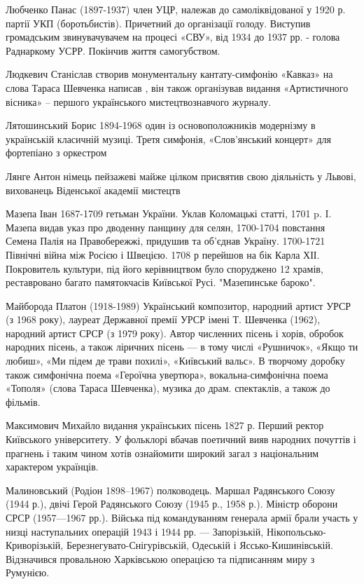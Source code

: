 Любченко Панас (1897-1937) член УЦР, належав до самоліквідованої у 1920 р. партії УКП (боротьбистів). Причетний до організації голоду. Виступив громадським звинувачувачем на процесі «СВУ», від 1934 до 1937 рр. - голова Раднаркому УСРР. Покінчив життя самогубством.

Людкевич Станіслав створив монументальну кантату-симфонію «Кавказ» на слова Тараса Шевченка написав , він також організував видання «Артистичного вісника» – першого українського мистецтвознавчого журналу. 

Лятошинський Борис 1894-1968 один із основоположників модернізму в українській класичній музиці.  Третя симфонія, «Слов’янський концерт» для фортепіано з оркестром

Лянге Антон  німець  пейзажеві майже цілком присвятив свою діяльність у Львові, вихованець Віденської академії мистецтв  

Мазепа  Іван 1687-1709 гетьман України. Уклав Коломацькі статті, 1701 p. I. Мазепа видав указ про дводенну панщину для селян, 1700-1704 повстання Семена Палія на Правобережжі, придушив та об’єднав Україну. 1700-1721 Північні війна між Росією і Швецією. 1708 р перейшов на бік Карла ХІІ. Покровитель культури, під його керівництвом було споруджено 12 храмів, реставровано багато памятокчасів Київської Русі. "Мазепинське бароко".

Майборода Платон (1918-1989) Український композитор, народний артист УРСР (з 1968 року), лауреат Державної премії УРСР імені Т. Шевченка (1962), народний артист СРСР (з 1979 року). Автор численних пісень і хорів, обробок народних пісень, а також ліричних пісень — в тому числі «Рушничок», «Якщо ти любиш», «Ми підем де трави похилі», «Київський вальс». В творчому доробку також симфонічна поема «Героїчна увертюра», вокальна-симфонічна поема «Тополя» (слова Тараса Шевченка), музика до драм. спектаклів, а також до фільмів.

Максимович Михайло видання українських пісень 1827 р. Перший ректор Київського університету. У фольклорі вбачав поетичний вияв народних почуттів і прагнень і таким чином хотів ознайомити широкий загал з національним характером українців.

Малиновський (Родіон 1898–1967) полководець. Маршал Радянського Союзу (1944 р.), двічі Герой Радянського Союзу (1945 р., 1958 р.). Міністр оборони СРСР (1957—1967 рр.). Війська під командуванням генерала армії брали участь у низці наступальних операцій 1943 і 1944 рр. — Запорізькій, Нікопольсько-Криворізькій, Березнегувато-Снігурівській, Одеській і Яссько-Кишинівській. Відзначився провальною Харківською операцією та підписанням миру з Румунією. 

